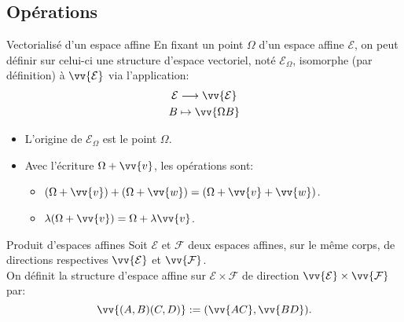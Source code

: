 \documentclass[aspectratio=1610 %
]{beamer}
\let\ens\mathcal
\begin{document}
\subsection{Opérations}
  \begin{frame}{Vectorialisé d'un espace affine}
    En fixant un point $\Omega$ d'un espace affine $\ens{E}$, on peut définir sur celui-ci une structure d'espace vectoriel, noté $\ens{E}_{\Omega}$, isomorphe (par définition) à $\vv{\ens{E}}$ via l'application:
    \begin{gather*}
      \ens{E} \longrightarrow \vv{\ens{E}}\\
      B \mapsto \vv{\Omega B}
    \end{gather*}
    \begin{itemize}[<+(1)->]
      \item L'origine de $\ens{E}_{\Omega}$ est le point $\Omega$.
      \item Avec l'écriture $\Omega+\vv{v}$, les opérations sont:
      \begin{itemize}[<+(1)->]
        \item $(\Omega+\vv{v})+(\Omega+\vv{w})=(\Omega+\vv{v}+\vv{w})$.
        \item $\lambda(\Omega+\vv{v})=\Omega+\lambda\vv{v}$.
      \end{itemize}
    \end{itemize}
  \end{frame}
  \begin{frame}{Produit d'espaces affines}
    Soit $\ens{E}$ et $\ens{F}$ deux espaces affines, sur le même corps, de directions respectives $\vv{\ens{E}}$ et $\vv{\ens{F}}$.\\
    On définit la structure d'espace affine sur $\ens{E} \times \ens{F}$ de direction $\vv{\ens{E}} \times \vv{\ens{F}}$ par:
    $$
      \vv{(A,B)(C,D)}:=(\vv{AC},\vv{BD}).
    $$
  \end{frame}
\end{document}
